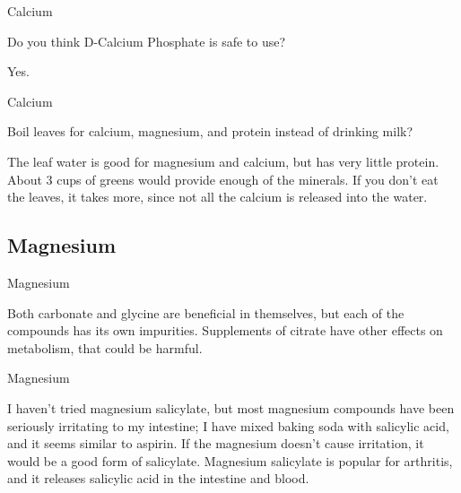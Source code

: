 \documentclass[11pt,oneside,openany,extrafontsizes]{memoir}
\begin{document}
\begin{qaexchange}{Calcium}

    \begin{question}
        Do you think D-Calcium Phosphate is safe to use?
    \end{question}

    \begin{answer}
      Yes.
    \end{answer}
\end{qaexchange}

\begin{qaexchange}{Calcium}

    \begin{question}
        Boil leaves for calcium, magnesium, and protein instead of drinking milk?
    \end{question}

    \begin{answer}
      The leaf water is good for magnesium and calcium, but has very little protein. About 3 cups of greens would provide enough of the minerals. If you don't eat the leaves, it takes more, since not all the calcium is released into the water.
    \end{answer}
\end{qaexchange}

\subsection{Magnesium}

\begin{standalonequote}{Magnesium}

    \begin{answer}
        Both carbonate and glycine are beneficial in themselves, but each of the compounds has its own impurities. Supplements of citrate have other effects on metabolism, that could be harmful.
    \end{answer}
\end{standalonequote}

\begin{standalonequote}{Magnesium}

    \begin{answer}
        I haven't tried magnesium salicylate, but most magnesium compounds have been seriously irritating to my intestine; I have mixed baking soda with salicylic acid, and it seems similar to aspirin. If the magnesium doesn't cause irritation, it would be a good form of salicylate. Magnesium salicylate is popular for arthritis, and it releases salicylic acid in the intestine and blood.
    \end{answer}
\end{standalonequote}
\end{document}
